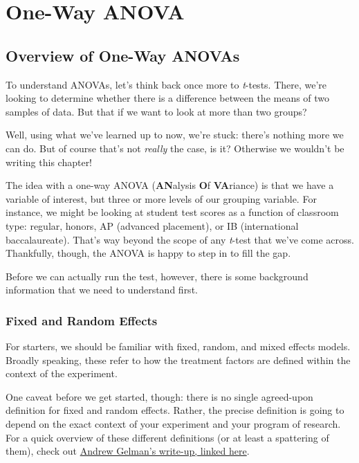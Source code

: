 
\chapter{One-Way ANOVA}

\section{Overview of One-Way ANOVAs}

To understand ANOVAs, let's think back once more to \textit{t}-tests. There, we're looking to determine whether there is a difference between the means of two samples of data. But that if we want to look at more than two groups? 

Well, using what we've learned up to now, we're stuck: there's nothing more we can do. But of course that's not \textit{really} the case, is it? Otherwise we wouldn't be writing this chapter!

The idea with a one-way ANOVA (\textbf{AN}alysis \textbf{O}f \textbf{VA}riance) is that we have a variable of interest, but three or more levels of our grouping variable. For instance, we might be looking at student test scores as a function of classroom type: regular, honors, AP (advanced placement), or IB (international baccalaureate). That's way beyond the scope of any \textit{t}-test that we've come across. Thankfully, though, the ANOVA is happy to step in to fill the gap.

Before we can actually run the test, however, there is some background information that we need to understand first.

\subsection{Fixed and Random Effects}

For starters, we should be familiar with fixed, random, and mixed effects models. Broadly speaking, these refer to how the treatment factors are defined within the context of the experiment.

One caveat before we get started, though: there is no single agreed-upon definition for fixed and random effects. Rather, the precise definition is going to depend on the exact context of your experiment and your program of research. For a quick overview of these different definitions (or at least a spattering of them), check out \href{http://andrewgelman.com/2005/01/25/why_i_dont_use/}{Andrew Gelman's write-up, linked here}.


